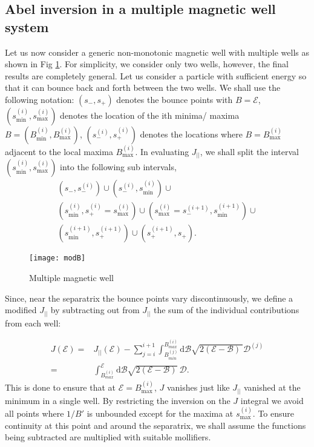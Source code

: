 \documentclass[aip,pop,reprint]{revtex4-1}
\newcommand*{\cB}{\mathcal{B}}
\newcommand*{\cD}{\mathcal{D}}
\newcommand*{\cE}{\mathcal{E}}
\newcommand*{\Jpl}{J_{||}}
\newcommand*{\dt}{\mathrm{d}}
\newcommand*{\lbr}{\left(}
\newcommand*{\rbr}{\right)}
\newcommand*\smpi[2]{s_{#1}^{#2}}
\newcommand*{\Bmax}{B_{\text{max}}}
\begin{document}
 \subsection{Abel inversion in a multiple magnetic well system}
 \label{subsec:abelJplmult}

Let us now consider a generic non-monotonic magnetic well with multiple wells as shown in Fig \ref{fig1}. For simplicity, we consider only two wells, however, the final results are completely general. Let us consider a particle with sufficient energy so that it can bounce back and forth between the two wells. We shall use the following notation: $(\smpi{-}{},\smpi{+}{})$ denotes the bounce points with $B=\cE$, $(\smpi{\text{min}}{(i)},\smpi{\text{max}}{(i)})$ denotes the location of the ith minima/ maxima $B=(B^{(i)}_{\text{min}},B^{(i)}_{\text{max}})$, $(\smpi{-}{(i)},\smpi{+}{(i)})$ denotes the locations where $B=B^{(i)}_{\text{max}}$ adjacent to the local maxima $B^{(i)}_{\text{max}}$. In evaluating $\Jpl$, we shall split the interval $(\smpi{\text{min}}{(i)},\smpi{\text{max}}{(i)})$ into the following sub intervals,
\begin{align*}
\lbr\smpi{-}{},\smpi{-}{(i)}\rbr\cup \lbr\smpi{-}{(i)},\smpi{\text{min}}{(i)} \rbr \cup\\ \lbr\smpi{\text{min}}{(i)},\smpi{+}{(i)}=\smpi{\text{max}}{(i)} \rbr \cup 
\lbr \smpi{\text{max}}{(i)}=\smpi{-}{(i+1)},\smpi{\text{min}}{(i+1)}\rbr  \cup  \\ \lbr\smpi{\text{min}}{(i+1)},\smpi{+}{(i+1)}\rbr  \cup \lbr \smpi{+}{(i+1)},\smpi{+}{} \rbr.
\end{align*}

\begin{figure}
\texttt{[image: modB]}
\caption{Multiple magnetic well}
\label{fig1}
\end{figure}



Since, near the separatrix the bounce points vary discontinuously, we define a modified $\Jpl$ by subtracting out from $\Jpl$ the sum of the individual contributions from each well:

\begin{align*}
    J(\cE)=& \Jpl(\cE) -\sum_{j=i}^{i+1} \int_{B^{(j)}_{min}}^{B_{max}^{(i)}}\dt \cB \sqrt{2(\cE-\cB)\:}\cD^{(j)}\\
    =& \int_{B^{(i)}_{max}}^\cE \dt \cB\sqrt{2(\cE-\cB)}\: \cD .
\end{align*}
This is done to ensure that at $\cE=\Bmax^{(i)}$, $J$ vanishes just like $\Jpl$ vanished at the minimum in a single well. By restricting the inversion on the $J$ integral we avoid all points where $1/B'$ is unbounded except for the maxima at $s^{(i)}_{\text{max}}$. To ensure continuity at this point and around the separatrix, we shall assume the functions being subtracted are multiplied with suitable mollifiers. 
\end{document}
